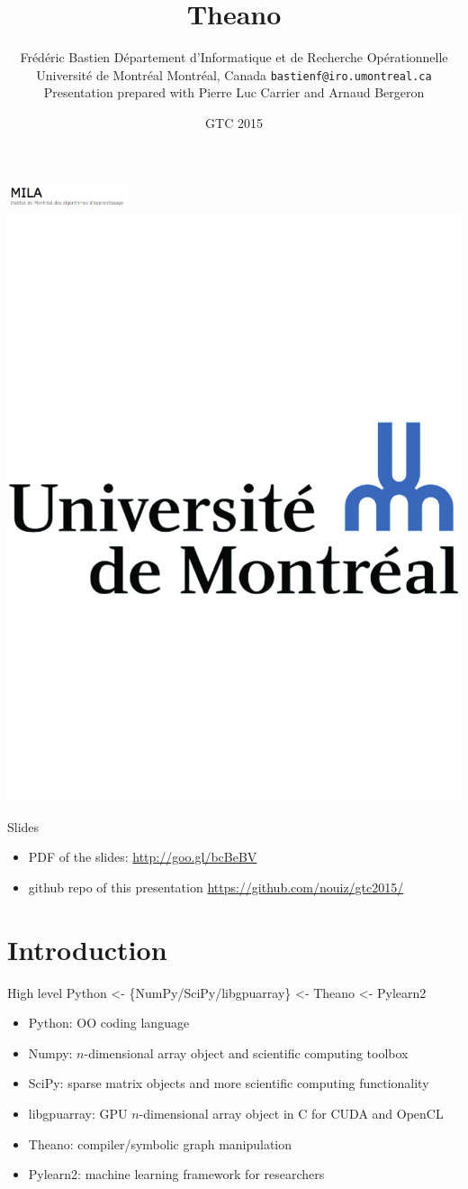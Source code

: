 \documentclass[utf8x,xcolor=pdftex,dvipsnames,table]{beamer}
\title{Theano}
\author{%
\footnotesize
Frédéric Bastien \newline
Département d'Informatique et de Recherche Opérationnelle \newline
Université de Montréal \newline
Montréal, Canada \newline
\texttt{bastienf@iro.umontreal.ca} \newline \newline
Presentation prepared with Pierre Luc Carrier and Arnaud Bergeron
}
\date{GTC 2015}
\begin{document}
\begin{frame}[plain]
 \titlepage
 \vspace{-5em}
 \includegraphics[width=1.4in]{pics/mila.png}
 \hfill
 \includegraphics[width=.8in]{pics/UdeM_NoirBleu_logo_Marie_crop}
\end{frame}

\begin{frame}{Slides}
\begin{itemize}
 \item PDF of the slides: \url{http://goo.gl/bcBeBV}
 \item github repo of this presentation \url{https://github.com/nouiz/gtc2015/}
\end{itemize}
\end{frame}

\section{Introduction}
\begin{frame}
  \tableofcontents[currentsection]
\end{frame}

\begin{frame}{High level}\setcounter{page}{1}
  Python <- \{NumPy/SciPy/libgpuarray\} <- Theano <- Pylearn2
  \begin{itemize}
  \item Python: OO coding language
  \item Numpy: $n$-dimensional array object and scientific computing toolbox
  \item SciPy: sparse matrix objects and more scientific computing functionality
  \item libgpuarray: GPU $n$-dimensional array object in C for CUDA and OpenCL
  \item Theano: compiler/symbolic graph manipulation
  \item Pylearn2: machine learning framework for researchers
  \end{itemize}
\end{frame}
\end{document}
